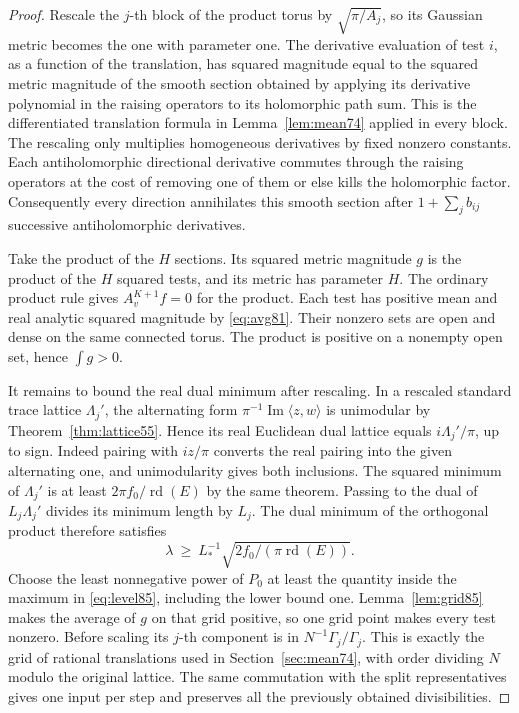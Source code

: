 \documentclass[a4paper,11pt]{article}
\theoremstyle{definition}
\theoremstyle{remark}
\numberwithin{equation}{section}
\begin{document}
\begin{proof}
Rescale the \(j\)-th block of the product torus by
\(\sqrt{\pi/A_j}\), so its Gaussian metric becomes the one with
parameter one. The derivative evaluation of test \(i\), as a
function of the translation, has squared magnitude equal to the
squared metric magnitude of the smooth section obtained by applying
its derivative polynomial in the raising operators to its
holomorphic path sum. This is the differentiated translation
formula in Lemma~\ref{lem:mean74} applied in every block.
The rescaling only multiplies homogeneous derivatives by fixed
nonzero constants. Each antiholomorphic directional derivative
commutes through the raising operators at the cost of removing
one of them or else kills the holomorphic factor. Consequently
every direction annihilates this smooth section after
\(1+\sum_j b_{ij}\) successive antiholomorphic derivatives.

Take the product of the \(H\) sections. Its squared metric
magnitude \(g\) is the product of the \(H\) squared tests, and
its metric has parameter \(H\). The ordinary product rule
gives \(A_v^{K+1}f=0\) for the product. Each test has positive
mean and real analytic squared magnitude by \eqref{eq:avg81}.
Their nonzero sets are open and dense on the same connected
torus. The product is positive on a nonempty open set, hence
\(\int g>0\).

It remains to bound the real dual minimum after rescaling.
In a rescaled standard trace lattice \(\Lambda_j'\), the
alternating form \(\pi^{-1}\operatorname{Im}\langle z,w\rangle\)
is unimodular by Theorem~\ref{thm:lattice55}. Hence its real
Euclidean dual lattice equals \(i\Lambda_j'/\pi\), up to sign.
Indeed pairing with \(i z/\pi\) converts the real pairing into
the given alternating one, and unimodularity gives both
inclusions. The squared minimum of \(\Lambda_j'\) is at least
\(2\pi f_0/\operatorname{rd}(E)\) by the same theorem. Passing
to the dual of \(L_j\Lambda_j'\) divides its minimum length
by \(L_j\). The dual minimum of the orthogonal product therefore
satisfies
\[
        \lambda\ \ge\ L_*^{-1}
                  \sqrt{2f_0/(\pi\operatorname{rd}(E))}.
\]
Choose the least nonnegative power of \(P_0\) at least the
quantity inside the maximum in \eqref{eq:level85}, including
the lower bound one. Lemma~\ref{lem:grid85} makes the average of
\(g\) on that grid positive, so one grid point makes every test
nonzero. Before scaling its \(j\)-th component is in
\(N^{-1}\Gamma_j/\Gamma_j\). This is exactly the grid of
rational translations used in Section~\ref{sec:mean74}, with
order dividing \(N\) modulo the original lattice. The same
commutation with the split representatives gives one input per
step and preserves all the previously obtained divisibilities.


\end{proof}
\end{document}
